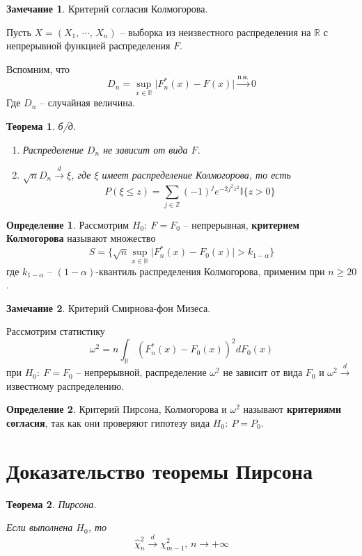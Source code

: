\documentclass[a4paper,12pt]{article}
\renewcommand{\leq}{\ensuremath{\leqslant}}
\renewcommand{\geq}{\ensuremath{\geqslant}}
\theoremstyle{plain}
\newtheorem{theorem}{Теорема}[section]
\theoremstyle{definition}
\newtheorem{definition}{Определение}[section]
\newtheorem*{note}{Замечание}
\theoremstyle{remark}
\begin{document}
\begin{note}
  Критерий согласия Колмогорова.

  Пусть $X = (X_1,\,\cdots,\,X_n)$ -- выборка из неизвестного распределения на $\mathbb{R}$ с непрерывной функцией распределения $F$.

  Вспомним, что
  \[
    D_n = \sup_{x \in \mathbb{R}}\vert F_n^*(x) - F(x)\vert \overset{\text{п.н.}}{\to} 0
  \]
  Где $D_n$ -- случайная величина.
\end{note}

\begin{theorem}
  б/д.

  \begin{enumerate}
    \item Распределение $D_n$ не зависит от вида $F$.
    \item $\sqrt{n}D_n \overset{d}{\to} \xi$, где $\xi$ имеет распределение Колмогорова, то есть
    \[
      P(\xi \leq z) = \sum_{j \in \mathbb{Z}}(-1)^je^{-2j^2z^2}\mathbb{I}\{z > 0\}
    \]
  \end{enumerate}
\end{theorem}

\begin{definition}
  Рассмотрим $H_0 :\: F = F_0$ -- непрерывная, \textbf{критерием Колмогорова} называют множество
  \[
    S = \{\sqrt{n}\sup_{x \in \mathbb{R}}\vert F_n^*(x) - F_0(x)\vert > k_{1 - \alpha}\}
  \]
  где $k_{1 - \alpha}$ -- $(1 - \alpha)$-квантиль распределения Колмогорова, применим при $n \geq 20$.
\end{definition}

\begin{note}
  Критерий Смирнова-фон Мизеса.

  Рассмотрим статистику
  \[
    \omega^2 = n\int_\mathbb{R}(F_n^*(x) - F_0(x))^2dF_0(x)
  \]
  при $H_0 :\: F = F_0$ -- непрерывной, распределение $\omega^2$ не зависит от вида $F_0$ и $\omega^2 \overset{d}{\to} $известному распределению.
\end{note}

\begin{definition}
  Критерий Пирсона, Колмогорова и $\omega^2$ называют \textbf{критериями согласия}, так как они проверяют гипотезу вида $H_0 :\: P = P_0$.
\end{definition}

\section{Доказательство теоремы Пирсона}
\begin{theorem}
  Пирсона.

  Если выполнена $H_0$, то 
  \[
    \hat{\chi}^2_n \overset{d}{\to} \chi^2_{m - 1},\, n \to +\infty
  \]
\end{theorem}
\end{document}

